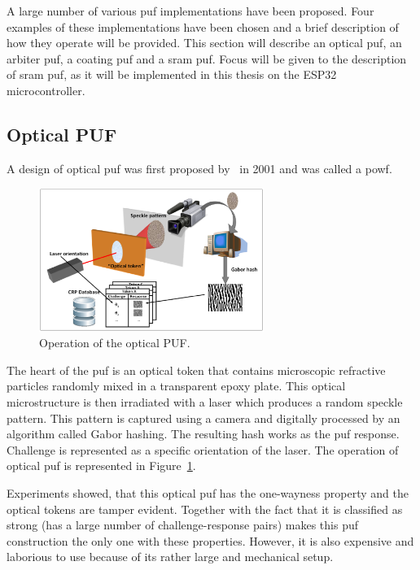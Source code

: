 A large number of various \gls{puf} implementations have been proposed. Four examples of these implementations have been chosen and a brief description of how they operate will be provided. This section will describe an optical \gls{puf}, an arbiter \gls{puf}, a coating \gls{puf} and a \gls{sram} \gls{puf}. Focus will be given to the description of \gls{sram} \gls{puf}, as it will be implemented in this thesis on the ESP32 microcontroller.

\subsection{Optical PUF}\label{sec:optical_puf}

A design of optical \gls{puf} was first proposed by~\cite{Pappu2001} in 2001 and was called a \glsdesc{powf}.

\begin{figure}[h!]
    \centering
    \captionsetup{justification=centering,margin=0.5cm}
    \includegraphics[width=0.65\textwidth]{images/optical_puf.png}
    \caption[Operation of the optical PUF.]{Operation of the optical PUF.}
    \label{fig:optical_puf}
\end{figure}

The heart of the \gls{puf} is an optical token that contains microscopic refractive particles randomly mixed in a transparent epoxy plate. This optical microstructure is then irradiated with a laser which produces a random speckle pattern. This pattern is captured using a camera and digitally processed by an algorithm called Gabor hashing. The resulting hash works as the \gls{puf} response. Challenge is represented as a specific orientation of the laser. The operation of optical \gls{puf} is represented in Figure~\ref{fig:optical_puf}.

Experiments showed, that this optical \gls{puf} has the one-wayness property and the optical tokens are tamper evident.\cite{Pappu2002} Together with the fact that it is classified as strong (has a large number of challenge-response pairs) makes this \gls{puf} construction the only one with these properties. However, it is also expensive and laborious to use because of its rather large and mechanical setup.\cite{Maes2012}

